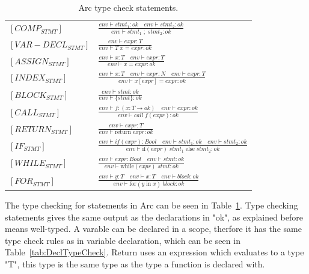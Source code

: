 \begin{table}[htb!]
    \centering
    \begin{tabular}{ll}
        \toprule
        $[COMP_{STMT}] $     & $\frac
            {env \vdash stmt_1 :ok \quad env \vdash stmt_2 :ok}
            {env \vdash stmt_1\;;\;stmt_2: ok}$
        \\ [12pt]
        $[VAR-DECL_{STMT}] $ & $\frac
            {env \vdash expr : T}
            {env \vdash  T \;x = expr: ok}$
        \\ [12pt]
        $[ASSIGN_{STMT}]$    & $\frac
            {env\vdash x: T \quad env \vdash expr : T}
            {env\vdash x = expr: ok}$
        \\ [12pt]
        $[INDEX_{STMT}] $    & $\frac
            {env \vdash x : T \quad env \vdash expr : N \quad env \vdash expr : T}
            {env \vdash x[expr] = expr: ok}$
        \\ [12pt]
        $[BLOCK_{STMT}] $    & $\frac
            {env \vdash stmt :ok}
            {env \vdash \{stmt\}: ok}$
        \\ [12pt]
        $[CALL_{STMT}] $     & $\frac
            {env \vdash f:(x:T \rightarrow ok)\quad env \vdash expr:ok}
            {env \vdash call \;f(expr): ok}$
        \\ [12pt]
        $[RETURN_{STMT}] $   & $\frac
            {env \vdash expr: T}
            {env \vdash \text{return} \;expr: ok}$
        \\ [12pt]
        $[IF_{STMT}] $       & $\frac
            {env \vdash if (expr) : Bool \quad env \vdash stmt_1 :ok \quad env \vdash stmt_2 :ok}
            {env \vdash \text{if} (expr) \;stmt_1 \;\text{else} \;stmt_2: ok}$
        \\ [12pt]
        $[WHILE_{STMT}] $    & $\frac
            {env \vdash  expr : Bool \quad env \vdash stmt :ok}
            {env \vdash \text{while} (expr) \;stmt : ok}$
        \\ [12pt]
        $[FOR_{STMT}] $      & $\frac
            {env \vdash  y : T \quad env \vdash x : T \quad env \vdash block :ok}
            {env \vdash \text{for} (y \; \text{in} \; x) \; block : ok}$
        \\
        \bottomrule
    \end{tabular}
    \caption{Arc type check statements.}
    \label{tab:StatementTypeCheck}
\end{table}


The type checking for statements in Arc can be seen in Table~\ref{tab:StatementTypeCheck}. Type checking statements gives the same output as the declarations in "ok", as explained before means well-typed. A varable can be declared in a scope, therfore it has the same type check rules as in variable declaration, which can be seen in Table~\ref{tab:DeclTypeCheck}. Return uses an expression which evaluates to a type "T", this type is the same type as the type a function is declared with.
